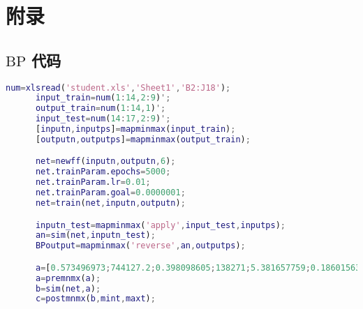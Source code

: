 \section{附录}
  \subsection{$\mathrm{BP}$ 代码}
    \lstset{
      basicstyle=\sffamily,
      keywordstyle=\bfseries,
      commentstyle=\rmfamily\itshape,
      stringstyle=\ttfamily
    }
    \begin{lstlisting}[language=MATLAB]
      num=xlsread('student.xls','Sheet1','B2:J18');
      input_train=num(1:14,2:9)';
      output_train=num(1:14,1)';
      input_test=num(14:17,2:9)';
      [inputn,inputps]=mapminmax(input_train);
      [outputn,outputps]=mapminmax(output_train);

      net=newff(inputn,outputn,6);
      net.trainParam.epochs=5000;
      net.trainParam.lr=0.01;
      net.trainParam.goal=0.0000001;
      net=train(net,inputn,outputn);

      inputn_test=mapminmax('apply',input_test,inputps);
      an=sim(net,inputn_test);
      BPoutput=mapminmax('reverse',an,outputps);

      a=[0.573496973;744127.2;0.398098605;138271;5.381657759;0.186015634;1.886403068;0.585678094];
      a=premnmx(a);
      b=sim(net,a);
      c=postmnmx(b,mint,maxt);
    \end{lstlisting}